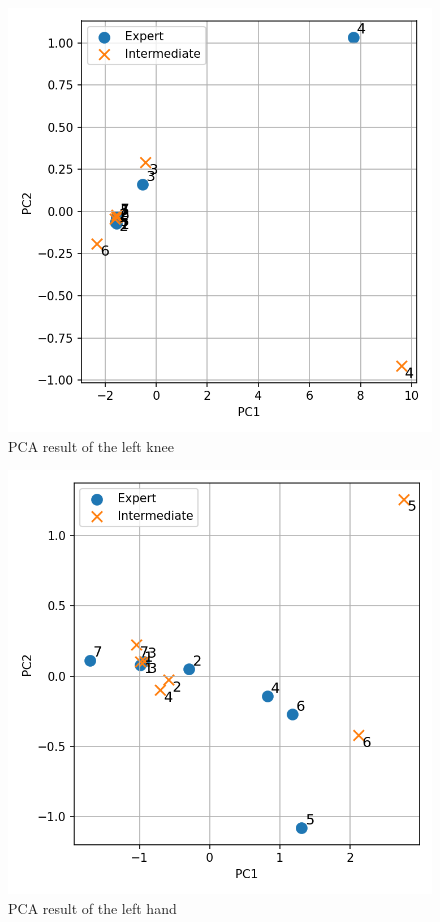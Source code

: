 \documentclass[conference]{IEEEtran}
\begin{document}
%
\begin{figure}[t]
	\centering
	\includegraphics[scale=0.45]{fig/LShin.pdf}
	\caption{PCA result of the left knee}
	\label{fig:LShin}
	\vspace{-0.4cm}
\end{figure}
%

%
\begin{figure}[t]
	\centering
	\includegraphics[scale=0.45]{fig/LHand.pdf}
	\caption{PCA result of the left hand}
	\label{fig:LHand}
	\vspace{-0.4cm}
\end{figure}
%
\end{document}
